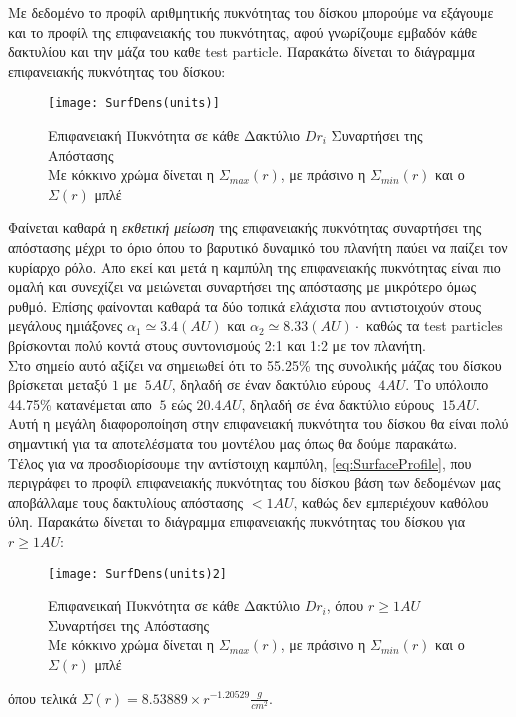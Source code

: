 \newpage

Με δεδομένο το προφίλ αριθμητικής πυκνότητας του δίσκου μπορούμε να εξάγουμε και το προφίλ της επιφανειακής του πυκνότητας, αφού γνωρίζουμε εμβαδόν κάθε δακτυλίου και την μάζα του καθε {\en test particle}. Παρακάτω δίνεται το διάγραμμα επιφανειακής πυκνότητας του δίσκου:


\begin{figure}[h]
  \centering
  \texttt{[image: SurfDens(units)]}
  \caption{Επιφανειακή Πυκνότητα σε κάθε Δακτύλιο $Dr_i$ Συναρτήσει της Απόστασης\\
  Με κόκκινο χρώμα δίνεται η $\Sigma_{max}(r)$, με πράσινο η $\Sigma_{min}(r)$ και ο $\Sigma(r)$ μπλέ}\label{fig:SurfDens}
\end{figure}

Φαίνεται καθαρά η {\it εκθετική μείωση} της επιφανειακής πυκνότητας συναρτήσει της απόστασης μέχρι το όριο όπου το βαρυτικό δυναμικό του πλανήτη παύει να παίζει τον κυρίαρχο ρόλο. Απο εκεί και μετά η καμπύλη της επιφανειακής πυκνότητας είναι πιο ομαλή και συνεχίζει να μειώνεται συναρτήσει της απόστασης με μικρότερο όμως ρυθμό. Επίσης φαίνονται καθαρά τα δύο τοπικά ελάχιστα που αντιστοιχούν στους μεγάλους ημιάξονες $\alpha_1 \simeq 3.4 (AU)$ και $\alpha_2 \simeq 8.33 (AU)\cdot$ καθώς τα {\en test particles} βρίσκονται πολύ κοντά στους συντονισμούς 2:1 και 1:2 με τον πλανήτη.\\

Στο σημείο αυτό αξίζει να σημειωθεί ότι το 55.25\% της συνολικής μάζας του δίσκου βρίσκεται μεταξύ $1$ με $~5 AU$, δηλαδή σε έναν δακτύλιο εύρους $~4AU$. Το υπόλοιπο 44.75\% κατανέμεται απο $~5$ εώς $20.4 AU$, δηλαδή σε ένα δακτύλιο εύρους $~15AU$. Αυτή η μεγάλη διαφοροποίηση στην επιφανειακή πυκνότητα του δίσκου θα είναι πολύ σημαντική για τα αποτελέσματα του μοντέλου μας όπως θα δούμε παρακάτω.\\

Τέλος για να προσδιορίσουμε την αντίστοιχη καμπύλη, \ref{eq:SurfaceProfile}, που περιγράφει το προφίλ επιφανειακής πυκνότητας του δίσκου βάση των δεδομένων μας αποβάλλαμε τους δακτυλίους απόστασης $<1 AU$, καθώς δεν εμπεριέχουν καθόλου ύλη. Παρακάτω δίνεται το διάγραμμα επιφανειακής πυκνότητας του δίσκου για $r \geq1 AU$:

\begin{figure}[h]
  \centering
  \texttt{[image: SurfDens(units)2]}
  \caption{Επιφανεικαή Πυκνότητα σε κάθε Δακτύλιο $Dr_i$, όπου $r \geq1 AU$ Συναρτήσει της Απόστασης\\
  Με κόκκινο χρώμα δίνεται η $\Sigma_{max}(r)$, με πράσινο η $\Sigma_{min}(r)$ και ο $\Sigma(r)$ μπλέ}\label{fig:SurfDens2}
\end{figure}

όπου τελικά $\Sigma(r) = 8.53889\times r^{-1.20529} \frac{g}{cm^2}$.


